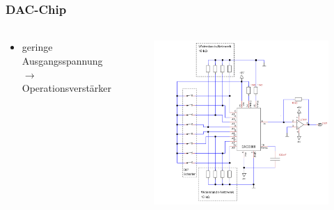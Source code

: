 \begin{frame}
    \frametitle{DAC-Chip}
    \framesubtitle{}
    \begin{columns}[c]
             \begin{block}{}
                \begin{itemize}
                    \item geringe Ausgangsspannung $\rightarrow$ Operationsverstärker
                \end{itemize}
             \end{block}
            \begin{figure}[H]
                \begin{center}
                        \includegraphics[scale=0.25]{./img/schaltung/dac_0.png}
                \end{center}
            \end{figure}    
    \end{columns}
\end{frame}

